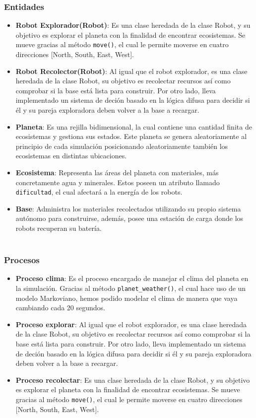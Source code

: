 \documentclass[a4paper,12pt]{article}
\begin{document}
\subsubsection{Entidades}
\begin{itemize}[label=\textbullet]
    \item \textbf{Robot Explorador(Robot)}: Es una clase heredada de la clase Robot, y su objetivo es explorar el planeta con la finalidad de encontrar ecosistemas. Se mueve gracias al método \texttt{move()}, el cual le permite moverse en cuatro direcciones [North, South, East, West].
    \item \textbf{Robot Recolector(Robot)}: Al igual que el robot explorador, es una clase heredada de la clase Robot, su objetivo es recolectar recursos así como comprobar si la base está lista para construir. Por otro lado, lleva implementado un sistema de deción basado en la lógica difusa para decidir si él y su pareja exploradora deben volver a la base a recargar.
    \item \textbf{Planeta}: Es una rejilla bidimensional, la cual contiene una cantidad finita de ecosistemas y gestiona sus estados. Este planeta se genera aleatoriamente al principio de cada simulación posicionando aleatoriamente también los ecosistemas en distintas ubicaciones.
    \item \textbf{Ecosistema}: Representa las áreas del planeta con materiales, más concretamente agua y minerales. Estos poseen un atributo llamado \texttt{dificultad}, el cual afectará a la energía de los robots.
    \item \textbf{Base}: Administra los materiales recolectados utilizando su propio sistema autónomo para construirse, además, posee una estación de carga donde los robots recuperan su batería.\\\\
\end{itemize}
\subsubsection{Procesos}
\begin{itemize}[label=\textbullet]
    \item \textbf{Proceso clima}: Es el proceso encargado de manejar el clima del planeta en la simulación. Gracias al método \texttt{planet\_weather()}, el cual hace uso de un modelo Markoviano, hemos podido modelar el clima de manera que vaya cambiando cada 20 segundos. 
    \item \textbf{Proceso explorar}: Al igual que el robot explorador, es una clase heredada de la clase Robot, su objetivo es recolectar recursos así como comprobar si la base está lista para construir. Por otro lado, lleva implementado un sistema de deción basado en la lógica difusa para decidir si él y su pareja exploradora deben volver a la base a recargar.
    \item \textbf{Proceso recolectar}: Es una clase heredada de la clase Robot, y su objetivo es explorar el planeta con la finalidad de encontrar ecosistemas. Se mueve gracias al método \texttt{move()}, el cual le permite moverse en cuatro direcciones [North, South, East, West].   
\end{itemize}
\newpage
\end{document}
